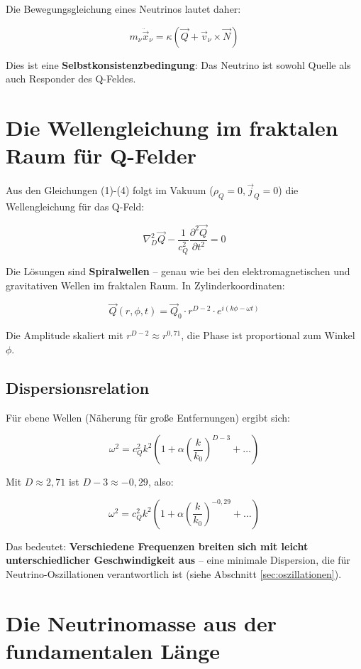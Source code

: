 \documentclass[12pt,a4paper]{article}
\begin{document}
Die Bewegungsgleichung eines Neutrinos lautet daher:

\[
m_\nu \ddot{\vec{x}}_\nu = \kappa(\vec{Q} + \vec{v}_\nu \times \vec{N})
\]

Dies ist eine \textbf{Selbstkonsistenzbedingung}: Das Neutrino ist sowohl Quelle als auch Responder des Q-Feldes.

\section{Die Wellengleichung im fraktalen Raum für Q-Felder}

Aus den Gleichungen (1)-(4) folgt im Vakuum (\(\rho_Q = 0, \vec{j}_Q = 0\)) die Wellengleichung für das Q-Feld:

\[
\nabla_D^2 \vec{Q} - \frac{1}{c_Q^2} \frac{\partial^2 \vec{Q}}{\partial t^2} = 0 \tag{6}
\]

Die Lösungen sind \textbf{Spiralwellen} – genau wie bei den elektromagnetischen und gravitativen Wellen im fraktalen Raum. In Zylinderkoordinaten:

\[
\vec{Q}(r, \phi, t) = \vec{Q}_0 \cdot r^{D-2} \cdot e^{i(k\phi - \omega t)} \tag{7}
\]

Die Amplitude skaliert mit \(r^{D-2} \approx r^{0,71}\), die Phase ist proportional zum Winkel \(\phi\).

\subsection{Dispersionsrelation}

Für ebene Wellen (Näherung für große Entfernungen) ergibt sich:

\[
\omega^2 = c_Q^2 k^2 \left( 1 + \alpha \left( \frac{k}{k_0} \right)^{D-3} + \dots \right) \tag{8}
\]

Mit \(D \approx 2,71\) ist \(D-3 \approx -0,29\), also:

\[
\omega^2 = c_Q^2 k^2 \left( 1 + \alpha \left( \frac{k}{k_0} \right)^{-0,29} + \dots \right)
\]

Das bedeutet: \textbf{Verschiedene Frequenzen breiten sich mit leicht unterschiedlicher Geschwindigkeit aus} – eine minimale Dispersion, die für Neutrino-Oszillationen verantwortlich ist (siehe Abschnitt \ref{sec:oszillationen}).

\section{Die Neutrinomasse aus der fundamentalen Länge} \label{sec:neutrinomasse}
\end{document}
